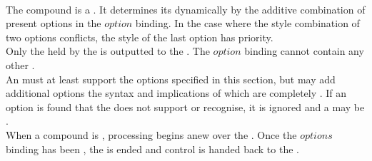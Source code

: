 \\

The compound  is a . It determines its  dynamically by the additive combination of present options in the \inline$option$ binding. In the case where the style combination of two options conflicts, the style of the last option has priority. \\

Only the  held by the  is outputted to the . The \inline$option$ binding cannot contain any other .\\

An  must at least support the options specified in this section, but may add additional options the syntax and implications of which are completely . If an option is found that the  does not support or recognise, it is ignored and a  may be . \\

When a compound  is , processing begins anew over the . Once the \inline$options$ binding has been , the  is ended and control is handed back to the .











